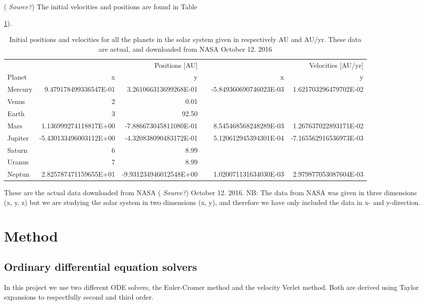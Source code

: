 \documentclass[norsk,a4paper,12pt]{article}
\begin{document}
(\emph{\color{red} Source?}) The initial velocities and positions are found in Table {\ref{table:Positions}).
\begin{table}[H]
\centering
\label{table:Positions}
\caption{Initial positions and velocities for all the planets in the solar system given in respectively AU and AU/yr. These data are actual, and downloaded from NASA October 12. 2016}
\begin{tabular}{lrrrrr}
\hline
\multicolumn{3}{r}{Positions [AU]} & \multicolumn{3}{r}{Velocities [AU/yr]} \\
\cline{2-3}
\cline{5-6}
Planet           & x & y &  & x & y \\
\hline
Mercury      & 9.479178499336547E-01 & 3.261066313699268E-01 & & -5.849360690746023E-03 &1.621703296479702E-02\\
Venus        & 2        & 0.01       \\
Earth        & 3     & 92.50      \\
Mars         & 1.136999274118817E+00     & -7.886673045811080E-01 & & 8.545468568248289E-03 & 1.267637022893171E-02      \\
Jupiter      & -5.430133496003112E+00    & -4.320838090483172E-01 & & 5.120612945394301E-04 & -7.165562916536973E-03    \\
Saturn       & 6      & 8.99       \\
Uranus 		 & 7      & 8.99       \\
Neptun 		 & 2.825787471159655E+01      & -9.931234946012548E+00 & & 1.020071131634030E-03 & 2.979877053087604E-03       \\
\hline
\end{tabular}
\end{table}
These are the actual data downloaded from NASA (\emph{\color{red} Source?}) October 12. 2016. NB: The data from NASA was given in three dimensions (x, y, z) but we are studying the solar system in two dimensions (x, y), and therefore we have only included the data in x- and y-direction.\par\vspace{3mm}


\section{Method}
\subsection{Ordinary differential equation solvers}
In this project we use two different ODE solvers, the Euler-Cromer method and the velocity Verlet method. Both are derived using Taylor expansions to respectfully second and third order. 
}
\end{document}
